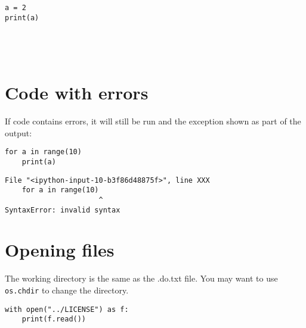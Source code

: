 \documentclass[%
oneside,                 %
final,                   %
chapterprefix=true,      %
open=right,              %
10pt]{book}
\begin{document}
\begin{Verbatim}[numbers=none,fontsize=\fontsize{9pt}{9pt},baselinestretch=0.95]
a = 2
print(a)

\end{Verbatim}

\begin{Verbatim}[numbers=none,fontsize=\fontsize{9pt}{9pt},baselinestretch=0.95]

\end{Verbatim}



\begin{Verbatim}[numbers=none,fontsize=\fontsize{9pt}{9pt},baselinestretch=0.95]


\end{Verbatim}

\begin{Verbatim}[numbers=none,fontsize=\fontsize{9pt}{9pt},baselinestretch=0.95]

\end{Verbatim}

\section{Code with errors}

If code contains errors, it will still be run and the exception shown as part
of the output:




\begin{Verbatim}[numbers=none,fontsize=\fontsize{9pt}{9pt},baselinestretch=0.95]
for a in range(10)
    print(a)

\end{Verbatim}

\begin{Verbatim}[numbers=none,fontsize=\fontsize{9pt}{9pt},baselinestretch=0.95]
  File "<ipython-input-10-b3f86d48875f>", line XXX
    for a in range(10)
                      ^
SyntaxError: invalid syntax
\end{Verbatim}

\section{Opening files}

The working directory is the same as the .do.txt file.
You may want to use \texttt{os.chdir} to change the directory.




\begin{Verbatim}[numbers=none,fontsize=\fontsize{9pt}{9pt},baselinestretch=0.95]
with open("../LICENSE") as f:
    print(f.read())

\end{Verbatim}
\end{document}
